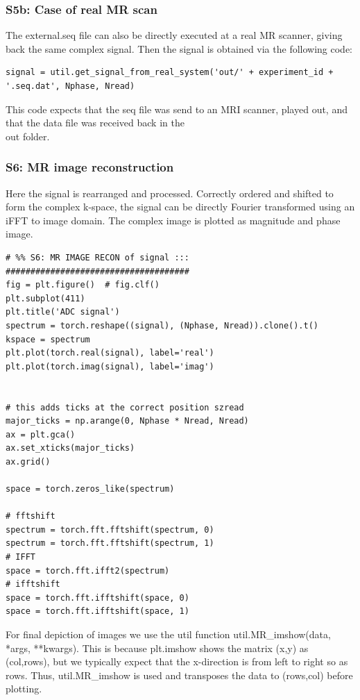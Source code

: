 \documentclass[a4paper,12pt]{extarticle}
\begin{document}
\subsubsection{S5b: Case of real MR scan}
The external.seq file can also be directly executed at a real MR scanner, giving back the same complex signal. Then the signal is obtained via the following code:

\begin{verbatim}
signal = util.get_signal_from_real_system('out/' + experiment_id + '.seq.dat', Nphase, Nread)
\end{verbatim}
This code expects that the seq file was send to an MRI scanner, played out, and that the data file was received back in the \\out folder.

\subsubsection{S6: MR image reconstruction}
Here the signal is rearranged and processed.
Correctly ordered and shifted to form the complex k-space, the signal can be directly Fourier transformed using an iFFT to image domain.
The complex image is plotted as magnitude and phase image.

\begin{verbatim}
# %% S6: MR IMAGE RECON of signal ::: #####################################
fig = plt.figure()  # fig.clf()
plt.subplot(411)
plt.title('ADC signal')
spectrum = torch.reshape((signal), (Nphase, Nread)).clone().t()
kspace = spectrum
plt.plot(torch.real(signal), label='real')
plt.plot(torch.imag(signal), label='imag')


# this adds ticks at the correct position szread
major_ticks = np.arange(0, Nphase * Nread, Nread)
ax = plt.gca()
ax.set_xticks(major_ticks)
ax.grid()

space = torch.zeros_like(spectrum)

# fftshift
spectrum = torch.fft.fftshift(spectrum, 0)
spectrum = torch.fft.fftshift(spectrum, 1)
# IFFT
space = torch.fft.ifft2(spectrum)
# ifftshift
space = torch.fft.ifftshift(space, 0)
space = torch.fft.ifftshift(space, 1)

\end{verbatim}

For final depiction of images we use the util function util.MR\_imshow(data, *args, **kwargs). This is because plt.imshow shows the matrix (x,y) as (col,rows), but we typically expect that the x-direction is from left to right so as rows. Thus, util.MR\_imshow is used and transposes the data to (rows,col) before plotting.
\end{document}
